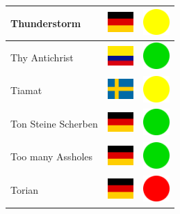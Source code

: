 \documentclass[12pt, a4paper, twoside]{report}
\begin{document}
\begin{center}
\begin{longtable}{|p{5cm}|p{2cm}|p{2cm}|}
Thunderstorm & \includegraphics[width=1cm]{4x3/de} & \includegraphics[width=1cm]{likes/m} \\ \hline
Thy Antichrist & \includegraphics[width=1cm]{4x3/co} & \includegraphics[width=1cm]{likes/y} \\ \hline
Tiamat & \includegraphics[width=1cm]{4x3/se} & \includegraphics[width=1cm]{likes/m} \\ \hline
Ton Steine Scherben & \includegraphics[width=1cm]{4x3/de} & \includegraphics[width=1cm]{likes/y} \\ \hline
Too many Assholes & \includegraphics[width=1cm]{4x3/de} & \includegraphics[width=1cm]{likes/y} \\ \hline
Torian & \includegraphics[width=1cm]{4x3/de} & \includegraphics[width=1cm]{likes/n} \\ \hline

\end{longtable}
\end{center}
\end{document}
